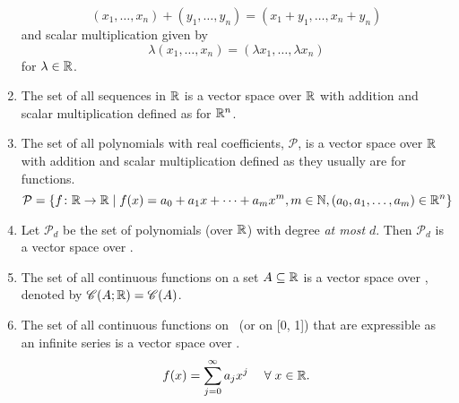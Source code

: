 \begin{example}
\begin{enumerate}[label=(\alph*)]
\[            (x_{1}, \dots, x_{n}) + (y_{1}, \dots, y_{n}) = (x_{1} + y_{1}, \dots, x_{n} + y_{n})
        \] and scalar multiplication given by \[
            \lambda (x_{1}, \dots, x_{n}) = (\lambda x_{1}, \dots, \lambda x_{n})
        \] for $\lambda \in \mathbb{R}$.
        \item The set of all sequences in $\mathbb{R}$ is a vector space over $\mathbb{R}$ with addition and scalar multiplication defined as for $\mathbb{R}^{n}$.
        \item The set of all polynomials with real coefficients, $\mathcal{P}$, is a vector space over $\mathbb{R}$ with addition and scalar multiplication defined as they usually are for functions. \[
            \mathcal{P} = \set{f \colon \R \to \R \mid f(x) = a_{0} + a_{1} x + \dots + a_{m} x^{m}, m \in \N, (a_{0}, a_{1}, \dots, a_{m}) \in \R^{n}}
        \]
        \item Let $\mathcal{P}_{d}$ be the set of polynomials (over $\mathbb{R}$) with degree \emph{at most} $d$. Then $\mathcal{P}_{d}$ is a vector space over \R.
        \item The set of all continuous functions on a set $A \subseteq \mathbb{R}$ is a vector space over \R, denoted by $\mathscr{C}(A ; \mathbb{R}) = \mathscr{C}(A)$.
        \item The set of all continuous functions on \R\ (or on [0, 1]) that are expressible as an infinite series is a vector space over \R. \[
            f(x) = \sum_{j = 0}^{\infty} a_{j} x^{j} \quad \;\forall\; x \in \mathbb{R}.
        \]
    \end{enumerate}
\end{example}

